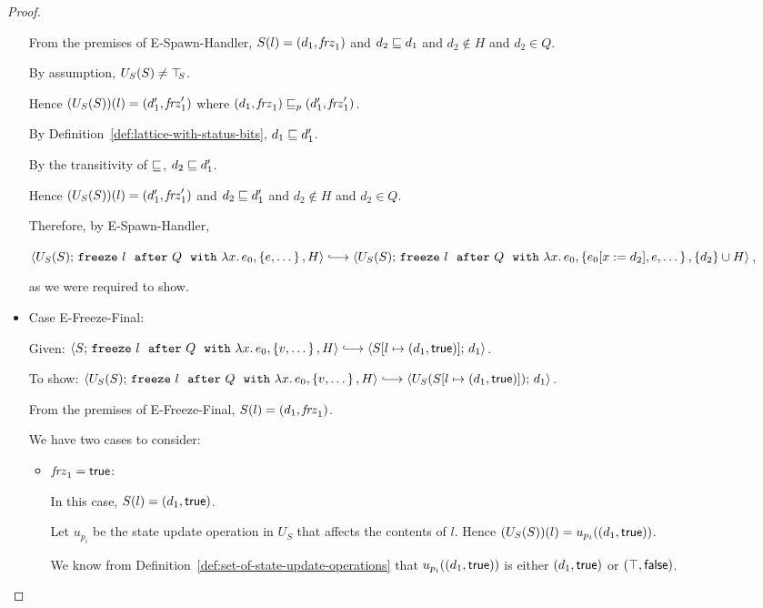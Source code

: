 \begin{proof}
\begin{itemize}
      From the premises of {\sc E-Spawn-Handler}, $S(l) =
      (d_1, \mathit{frz}_1)$ and $d_2 \sqsubseteq d_1$ and $d_2 \notin
      H$ and $d_2 \in Q$.

      By assumption, $U_S(S) \neq \top\hspace{-0.85mm}_{S}$.

      Hence $(U_S(S))(l) = (d'_1, \mathit{frz}'_1)$ where
      $(d_1, \mathit{frz}_1) \sqsubseteq_p (d'_1, \mathit{frz}'_1)$.

      By Definition~\ref{def:lattice-with-status-bits}, $d_1 \sqsubseteq
      d'_1$.

      By the transitivity of $\sqsubseteq$, $d_2 \sqsubseteq d'_1$.

      Hence $(U_S(S))(l) = (d'_1, \mathit{frz}'_1)$ and $d_2 \sqsubseteq
      d'_1$ and $d_2 \notin H$ and $d_2 \in Q$.

      Therefore, by {\sc E-Spawn-Handler},

      $\config{U_S(S)}{\freezeafterfull{l}{Q}{\lam{x}{e_0}}{\setof{e,
            \dots}}{H}} \parstepsto
      \config{U_S(S)}{\freezeafterfull{l}{Q}{\lam{x}{e_0}}{\setof{\subst{e_0}{x}{d_2},
            e, \dots}} {\{d_2\}\cup H}}$,

      as we were required to show.

    \item Case {\sc E-Freeze-Final}:

      Given:
      $\config{S}{\freezeafterfull{l}{Q}{\lam{x}{e_0}}{\setof{v,
            \dots}}{H}} \parstepsto
      \config{\extS{S}{l}{d_1}{\frozentrue}}{d_1}$.

      To show:
      $\config{U_S(S)}{\freezeafterfull{l}{Q}{\lam{x}{e_0}}{\setof{v,
            \dots}}{H}} \parstepsto
      \config{U_S(\extS{S}{l}{d_1}{\frozentrue})}{d_1}$.

      From the premises of {\sc E-Freeze-Final}, $S(l) =
      (d_1, \mathit{frz}_1)$.

      We have two cases to consider:
      \begin{itemize}
        \item $\mathit{frz}_1 = \textsf{true}$:

          In this case, $S(l) = (d_1, \textsf{true})$.

          Let $u_{p_i}$ be the state update operation in $U_S$ that
          affects the contents of $l$.  Hence $(U_S(S))(l) =
          u_{p_i}((d_1, \textsf{true}))$.

          We know from
          Definition~\ref{def:set-of-state-update-operations} that
          $u_{p_i}((d_1, \textsf{true}))$ is either
          $(d_1, \textsf{true})$ or $(\top, \textsf{false})$.


\end{itemize}
\end{itemize}
\end{proof}
